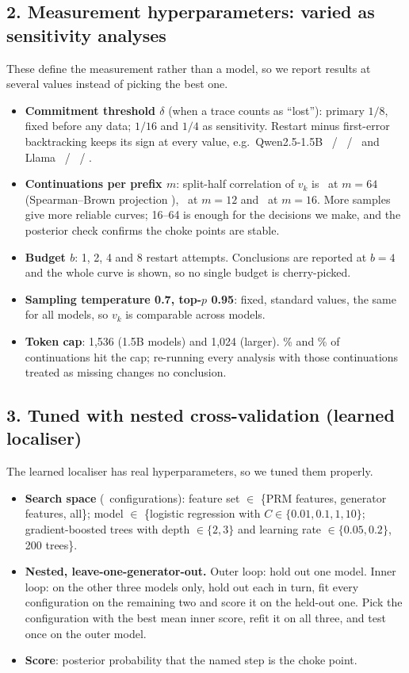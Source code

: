 \documentclass[11pt,a4paper]{article}
\begin{document}
\subsection{2. Measurement hyperparameters: varied as sensitivity analyses}
These define the measurement rather than a model, so we report results at several values instead of
picking the best one.
\begin{itemize}
\item \textbf{Commitment threshold $\delta$} (when a trace counts as ``lost''): primary $1/8$, fixed
before any data; $1/16$ and $1/4$ as sensitivity. Restart minus first-error backtracking keeps its
sign at every value, e.g.\ Qwen2.5-1.5B \QwenSmallAllDABtRestErr\ / \QwenSmallAllBtRestErr\ /
\QwenSmallAllDCBtRestErr\ and Llama \LlamaDABtRestErr\ / \LlamaBtRestErr\ / \LlamaDCBtRestErr.
\item \textbf{Continuations per prefix $m$}: split-half correlation of $v_k$ is \QwenSmallAllSplitR\
at $m=64$ (Spearman--Brown projection \QwenSmallAllSplitSB), \QwenMathSplitR\ at $m=12$ and
\LlamaSplitR\ at $m=16$. More samples give more reliable curves; 16--64 is enough for the decisions we
make, and the posterior check confirms the choke points are stable.
\item \textbf{Budget $b$}: 1, 2, 4 and 8 restart attempts. Conclusions are reported at $b=4$ and the
whole curve is shown, so no single budget is cherry-picked.
\item \textbf{Sampling temperature 0.7, top-$p$ 0.95}: fixed, standard values, the same for all
models, so $v_k$ is comparable across models.
\item \textbf{Token cap}: 1,536 (1.5B models) and 1,024 (larger). \QwenMathTruncPct\% and
\LlamaTruncPct\% of continuations hit the cap; re-running every analysis with those continuations
treated as missing changes no conclusion.
\end{itemize}

\subsection{3. Tuned with nested cross-validation (learned localiser)}
The learned localiser has real hyperparameters, so we tuned them properly.
\begin{itemize}
\item \textbf{Search space} (\ltGrid\ configurations): feature set $\in$ \{PRM features, generator
features, all\}; model $\in$ \{logistic regression with $C\in\{0.01,0.1,1,10\}$; gradient-boosted
trees with depth $\in\{2,3\}$ and learning rate $\in\{0.05,0.2\}$, 200 trees\}.
\item \textbf{Nested, leave-one-generator-out.} Outer loop: hold out one model. Inner loop: on the other
three models only, hold out each in turn, fit every configuration on the remaining two and score it on
the held-out one. Pick the configuration with the best mean inner score, refit it on all three, and
test once on the outer model.
\item \textbf{Score}: posterior probability that the named step is the choke point.
\end{itemize}
\end{document}
